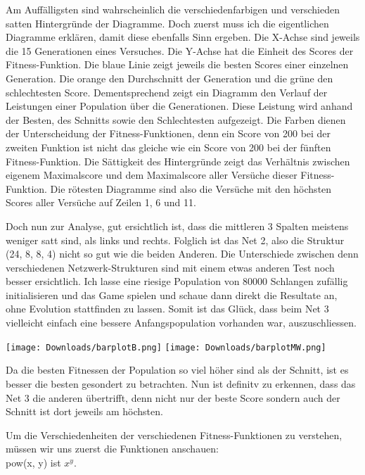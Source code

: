 \documentclass[11pt,a4paper,ngerman]{article}
\begin{document}
Am Auffälligsten sind wahrscheinlich die verschiedenfarbigen und verschieden satten Hintergründe der Diagramme. Doch zuerst muss ich die eigentlichen Diagramme erklären, damit diese ebenfalls Sinn ergeben. Die X-Achse sind jeweils die 15 Generationen eines Versuches. Die Y-Achse hat die Einheit des Scores der Fitness-Funktion. Die blaue Linie zeigt jeweils die besten Scores einer einzelnen Generation. Die orange den Durchschnitt der Generation und die grüne den schlechtesten Score. Dementsprechend zeigt ein Diagramm den Verlauf der Leistungen einer Population über die Generationen. Diese Leistung wird anhand der Besten, des Schnitts sowie den Schlechtesten aufgezeigt. Die Farben dienen der Unterscheidung der Fitness-Funktionen, denn ein Score von 200 bei der zweiten Funktion ist nicht das gleiche wie ein Score von 200 bei der fünften Fitness-Funktion. Die Sättigkeit des Hintergründe zeigt das Verhältnis zwischen eigenem Maximalscore und dem Maximalscore aller Versüche dieser Fitness-Funktion. Die rötesten Diagramme sind also die Versüche mit den höchsten Scores aller Versüche auf Zeilen 1, 6 und 11.

\bigskip
Doch nun zur Analyse, gut ersichtlich ist, dass die mittleren 3 Spalten meistens weniger satt sind, als links und rechts. Folglich ist das Net 2, also die Struktur (24, 8, 8, 4) nicht so gut wie die beiden Anderen. Die Unterschiede zwischen denn verschiedenen Netzwerk-Strukturen sind mit einem etwas anderen Test noch besser ersichtlich. Ich lasse eine riesige Population von 80000 Schlangen zufällig initialisieren und das Game spielen und schaue dann direkt die Resultate an, ohne Evolution stattfinden zu lassen. Somit ist das Glück, dass beim Net 3 vielleicht einfach eine bessere Anfangspopulation vorhanden war, auszuschliessen.

\begin{center}
    \texttt{[image: Downloads/barplotB.png]}
    \texttt{[image: Downloads/barplotMW.png]}
\end{center}

Da die besten Fitnessen der Population so viel höher sind als der Schnitt, ist es besser die besten gesondert zu betrachten. Nun ist definitv zu erkennen, dass das Net 3 die anderen übertrifft, denn nicht nur der beste Score sondern auch der Schnitt ist dort jeweils am höchsten.

\bigskip
Um die Verschiedenheiten der verschiedenen Fitness-Funktionen zu verstehen, müssen wir uns zuerst die Funktionen anschauen:\\
pow(x, y) ist $x^y$.
\end{document}

